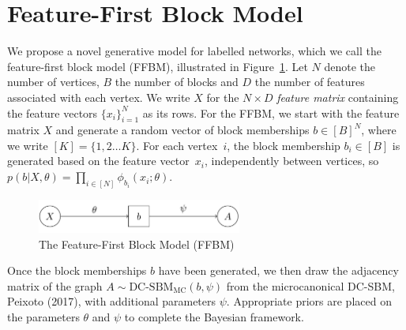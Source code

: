\section{Feature-First Block Model}

We propose a novel generative model for labelled networks, which we call the feature-first block model (FFBM),
illustrated in Figure~\ref{fig:ffbm}.
Let $N$ denote the number of vertices, $B$ the number of blocks
and $D$ the number of features associated with each vertex.
We write $X$ for the $N\times D$ {\em feature matrix} containing
the feature vectors $\{x_i\}_{i=1}^{N}$ 
as its rows.
%
For the FFBM, we start with the feature matrix $X$ and generate a random
vector of block memberships $b \in [B]^N$, where we write $[K] = \{1, 2 \dots K\}$. For each vertex~$i$, the
block membership $b_i\in[B]$ is generated based on the feature
vector~$x_i$, independently between vertices, so
$p(b| X, \theta) = \prod_{i \in [N]} \phi_{b_i} (x_i; \theta)$.
%
\begin{figure}[!ht]
	\centering
%		
	\includegraphics[width=0.6\textwidth]{fig/trayfig1}
	\caption{The Feature-First Block Model (FFBM)}
	\label{fig:ffbm}
\end{figure}

Once the block memberships $b$ have been generated, we then draw the 
adjacency matrix of the graph 
	$A \sim \textrm{DC-SBM}_{\textrm{MC}} (b, \psi)$
from the microcanonical DC-SBM, Peixoto (2017), with additional parameters 
$\psi$.
Appropriate priors are placed on the parameters $\theta$ and $\psi$ to 
complete the Bayesian framework.

